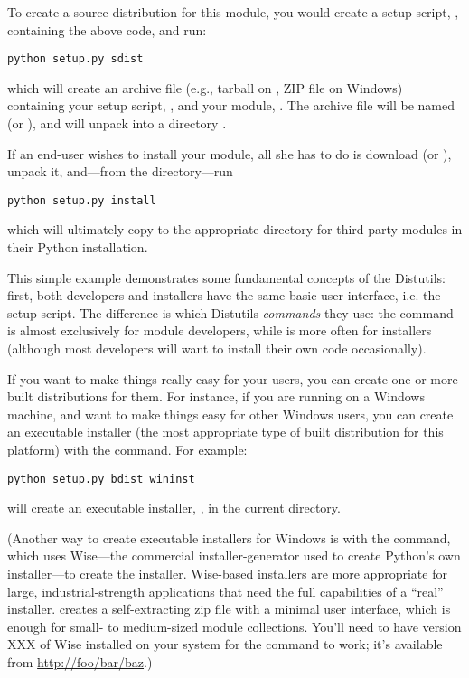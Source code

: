 \documentclass{howto}
\begin{document}
To create a source distribution for this module, you would create a
setup script, , containing the above code, and run:
\begin{verbatim}
python setup.py sdist
\end{verbatim}
which will create an archive file (e.g., tarball on \UNIX, ZIP file on
Windows) containing your setup script, , and your module,
.  The archive file will be named  (or
), and will unpack into a directory .

If an end-user wishes to install your  module, all she has
to do is download  (or ), unpack it,
and---from the  directory---run
\begin{verbatim}
python setup.py install
\end{verbatim}
which will ultimately copy  to the appropriate directory
for third-party modules in their Python installation.

This simple example demonstrates some fundamental concepts of the
Distutils: first, both developers and installers have the same basic
user interface, i.e. the setup script.  The difference is which
Distutils \emph{commands} they use: the  command is
almost exclusively for module developers, while  is
more often for installers (although most developers will want to install
their own code occasionally).

If you want to make things really easy for your users, you can create
one or more built distributions for them.  For instance, if you are
running on a Windows machine, and want to make things easy for other
Windows users, you can create an executable installer (the most
appropriate type of built distribution for this platform) with the
 command.  For example:
\begin{verbatim}
python setup.py bdist_wininst
\end{verbatim}
will create an executable installer, , in the
current directory.

(Another way to create executable installers for Windows is with the
 command, which uses Wise---the commercial
installer-generator used to create Python's own installer---to create
the installer.  Wise-based installers are more appropriate for large,
industrial-strength applications that need the full capabilities of a
``real'' installer.   creates a self-extracting
zip file with a minimal user interface, which is enough for small- to
medium-sized module collections.  You'll need to have version XXX of
Wise installed on your system for the  command to
work; it's available from \url{http://foo/bar/baz}.)
\end{document}
